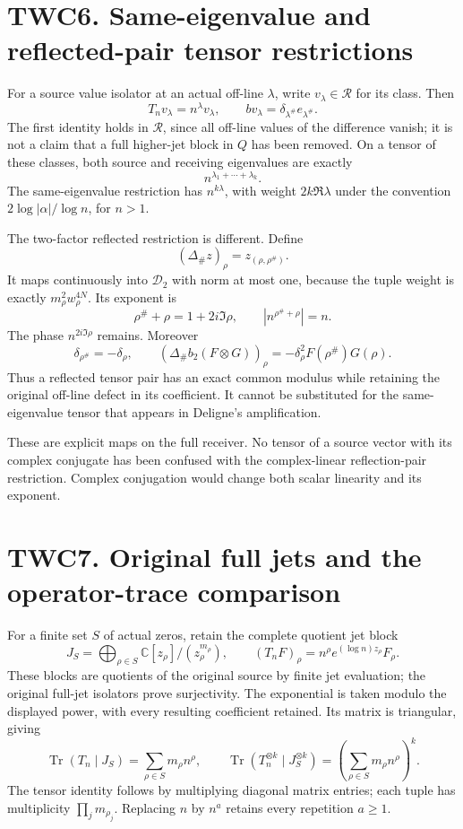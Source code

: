 \section{TWC6. Same-eigenvalue and reflected-pair tensor
restrictions}\label{twc6.-same-eigenvalue-and-reflected-pair-tensor-restrictions}

For a source value isolator at an actual off-line \(\lambda\), write
\(v_\lambda\in\mathcal R\) for its class. Then \[
T_nv_\lambda=n^\lambda v_\lambda,\qquad
b v_\lambda=\delta_{\lambda^\#}e_{\lambda^\#}.
\tag{TWC6.1}
\] The first identity holds in \(\mathcal R\), since all off-line values
of the difference vanish; it is not a claim that a full higher-jet block
in \(Q\) has been removed. On a tensor of these classes, both source and
receiving eigenvalues are exactly \[
n^{\lambda_1+\cdots+\lambda_k}.
\tag{TWC6.2}
\] The same-eigenvalue restriction has \(n^{k\lambda}\), with weight
\(2k\Re\lambda\) under the convention \(2\log|\alpha|/\log n\), for
\(n>1\).

The two-factor reflected restriction is different. Define \[
(\Delta_\#z)_\rho=z_{(\rho,\rho^\#)}.
\tag{TWC6.3}
\] It maps continuously into \(\mathscr D_2\) with norm at most one,
because the tuple weight is exactly \(m_\rho^2w_\rho^{4N}\). Its
exponent is \[
\rho^\#+\rho=1+2i\Im\rho,
\qquad|n^{\rho^\#+\rho}|=n.
\tag{TWC6.4}
\] The phase \(n^{2i\Im\rho}\) remains. Moreover \[
\delta_{\rho^\#}=-\delta_\rho,\qquad
(\Delta_\# b_2(F\otimes G))_\rho
=-\delta_\rho^2 F(\rho^\#)G(\rho).
\tag{TWC6.5}
\] Thus a reflected tensor pair has an exact common modulus while
retaining the original off-line defect in its coefficient. It cannot be
substituted for the same-eigenvalue tensor that appears in Deligne's
amplification.

These are explicit maps on the full receiver. No tensor of a source
vector with its complex conjugate has been confused with the
complex-linear reflection-pair restriction. Complex conjugation would
change both scalar linearity and its exponent.

\section{TWC7. Original full jets and the operator-trace
comparison}\label{twc7.-original-full-jets-and-the-operator-trace-comparison}

For a finite set \(S\) of actual zeros, retain the complete quotient jet
block \[
J_S=\bigoplus_{\rho\in S}\mathbb C[z_\rho]/(z_\rho^{m_\rho}),
\qquad (T_nF)_\rho=n^\rho e^{(\log n)z_\rho}F_\rho.
\tag{TWC7.1}
\] These blocks are quotients of the original source by finite jet
evaluation; the original full-jet isolators prove surjectivity. The
exponential is taken modulo the displayed power, with every resulting
coefficient retained. Its matrix is triangular, giving \[
\operatorname{Tr}(T_n\mid J_S)=\sum_{\rho\in S}m_\rho n^\rho,
\qquad
\operatorname{Tr}(T_n^{\otimes k}\mid J_S^{\otimes k})
=\left(\sum_{\rho\in S}m_\rho n^\rho\right)^k.
\tag{TWC7.2}
\] The tensor identity follows by multiplying diagonal matrix entries;
each tuple has multiplicity \(\prod_jm_{\rho_j}\). Replacing \(n\) by
\(n^a\) retains every repetition \(a\ge1\).

